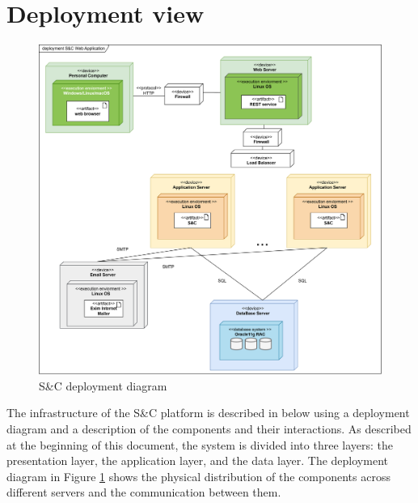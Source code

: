 \section{Deployment view}\label{sec:deployment view}
\begin{figure}[H]
    \centering
    \includegraphics[width=1\textwidth]{Images/Deployment_View.png}
    \caption{S\&C deployment diagram}\label{fig:deployment_diagram}
\end{figure}
The infrastructure of the S\&C platform is described in below using a deployment diagram and a description of the components and their interactions.
As described at the beginning of this document, the system is divided into three layers: the presentation layer, the application layer, and the data layer.
The deployment diagram in Figure \ref{fig:deployment_diagram} shows the physical distribution of the components across different servers and the communication
between them.

